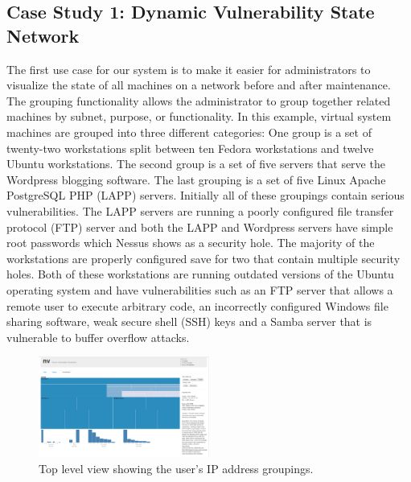 \documentclass{acm_proc_article-sp}
\begin{document}
\subsection{Case Study 1: Dynamic Vulnerability State Network }
The first use case for our system is to make it easier for administrators to
visualize the state of all machines on a network before and after maintenance. 
The grouping functionality allows
the administrator to group together related machines by subnet, purpose, or
functionality. In this example, virtual system machines are grouped into three
different categories: One group is a set of twenty-two workstations split
between ten Fedora workstations and twelve Ubuntu workstations. The second group is
a set of five servers that serve the Wordpress blogging software. The last
grouping is a set of five Linux Apache PostgreSQL PHP (LAPP) servers.
Initially all of these groupings contain serious vulnerabilities.
The LAPP servers are running a poorly configured file transfer protocol (FTP) server
and both the LAPP and Wordpress servers have simple root passwords
which Nessus shows as a security hole. The majority of the workstations are properly configured
save for two that contain multiple security holes. Both of these workstations are
running outdated versions of the Ubuntu operating system and have
vulnerabilities such as an FTP server that allows a remote user to execute
arbitrary code, an incorrectly configured Windows file sharing software, weak secure shell
(SSH) keys and a Samba server that is vulnerable to buffer overflow attacks.

\begin{figure}
  \centering
  \includegraphics[width=0.5\textwidth]{../screenshots/final/SimGroupSingle}
  \caption{Top level view showing the user's IP address groupings.}
  \label{SimOverview:fig}
\end{figure}
\end{document}
